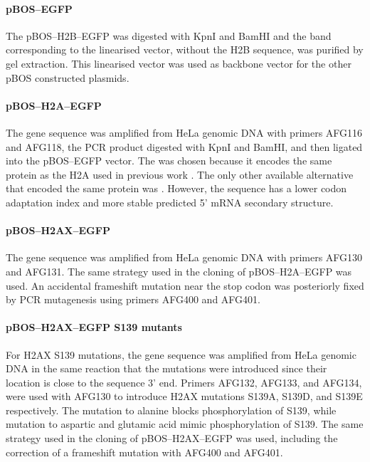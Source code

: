       \paragraph{pBOS--EGFP}
      The pBOS--H2B--EGFP was digested with KpnI and BamHI and the
      band corresponding to the linearised vector, without the H2B
      sequence, was purified by gel extraction.  This linearised vector
      was used as backbone vector for the other pBOS constructed
      plasmids.

      \paragraph{pBOS--H2A--EGFP}
      The  gene sequence was amplified from HeLa
      genomic DNA with primers AFG116 and AFG118, the PCR product
      digested with KpnI and BamHI, and then ligated into the
      pBOS--EGFP vector.  The  was chosen because it
      encodes the same protein as the H2A used in previous work
      \citep{flaus2004sin}.  The only other available alternative
      that encoded the same protein was .
      However, the  sequence has a lower codon
      adaptation index and more stable predicted 5' mRNA secondary structure.

      \paragraph{pBOS--H2AX--EGFP}
      The  gene sequence was amplified from HeLa genomic
      DNA with primers AFG130 and AFG131.  The same strategy used in
      the cloning of pBOS--H2A--EGFP was used.  An accidental
      frameshift mutation near the stop codon was posteriorly fixed by
      PCR mutagenesis using primers AFG400 and AFG401.

      \paragraph{pBOS--H2AX--EGFP S139 mutants}
      For H2AX S139 mutations, the  gene sequence was
      amplified from HeLa genomic DNA in the same reaction that the
      mutations were introduced since their location is close to the
      sequence 3' end.  Primers AFG132, AFG133, and AFG134, were used
      with AFG130 to introduce H2AX mutations S139A, S139D, and S139E
      respectively.  The mutation to alanine blocks phosphorylation of
      S139, while mutation to aspartic and glutamic acid mimic
      phosphorylation of S139.  The same strategy used in the cloning
      of pBOS--H2AX--EGFP was used, including the correction of a
      frameshift mutation with AFG400 and AFG401.

